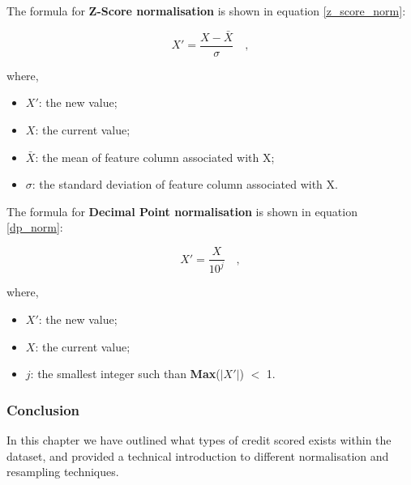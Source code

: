             
            
            \vspace{20pt} \noindent The formula for \textbf{Z-Score normalisation} is shown in equation \ref{z_score_norm}: 
            
                \begin{equation}\label{z_score_norm}
                    X' = \frac{X - \bar{X}}{\sigma} \quad ,
                \end{equation}
                \begin{adjustwidth}{2.5em}{0pt}
                    where,
                    \begin{itemize}[label=]
                        \item $X'$: the new value;
                        \item $X$: the current value;
                        \item $\bar{X}$: the mean of feature column associated with X;
                        \item $\sigma$: the standard deviation of feature column associated with X. 
                    \end{itemize}
                \end{adjustwidth}
    
    
            \vspace{20pt} \noindent The formula for \textbf{Decimal Point normalisation} is shown in equation \ref{dp_norm}: 
            
                \begin{equation} \label{dp_norm}
                    X' = \frac{X}{10 ^ j} \quad ,
                \end{equation}
                \begin{adjustwidth}{2.5em}{0pt}
                    where,
                    \begin{itemize}[label=]
                        \item $X'$: the new value;
                        \item $X$: the current value;
                        \item $j$: the smallest integer such than \textbf{Max}($| X' |$) $<$ 1.
                    \end{itemize}
                \end{adjustwidth}


        \subsubsection{Conclusion}
            In this chapter we have outlined what types of credit scored exists within the dataset, and provided a technical introduction to different normalisation and resampling techniques.            
    
    
    
        
    
    
        
